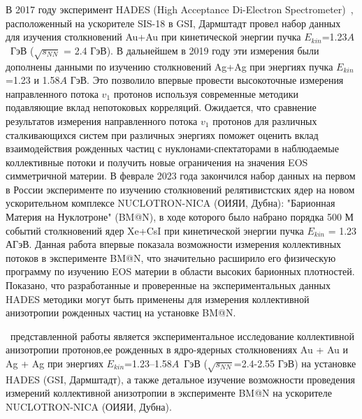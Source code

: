 В 2017 году эксперимент HADES (High Acceptance Di-Electron Spectrometer)~\cite{HADES:2009aat}, расположенный на ускорителе SIS-18 в GSI, Дармштадт провел набор данных для изучения  столкновений Au+Au  при кинетической энергии пучка $E_{kin}$=1.23$A$~ГэВ ($\sqrt{s_{NN}}$ = 2.4 ГэВ).
В дальнейшем в 2019 году эти измерения были дополнены данными по изучению столкновений Ag+Ag при энергиях пучка $E_{kin}$=1.23 и 1.58$A$ ГэВ.
Это позволило впервые провести высокоточные измерения направленного потока $v_1$ протонов используя современные методики подавляющие вклад непотоковых корреляций.  
Ожидается, что сравнение результатов измерения направленного потока $v_1$ протонов для различных сталкивающихся систем при различных энергиях поможет  оценить вклад взаимодействия рожденных частиц с нуклонами-спектаторами в наблюдаемые коллективные  потоки и получить новые ограничения на значения EOS симметричной материи.
В феврале 2023 года закончился набор данных на первом в России эксперименте по изучению столкновений релятивистских ядер на новом ускорительном комплексе NUCLOTRON-NICA (ОИЯИ, Дубна): "Барионная Материя на Нуклотроне" (BM@N), в ходе которого было набрано порядка 500 М событий столкновений ядер Xe+CsI при кинетической энергии пучка  $E_{kin}$ = 1.23 АГэВ. Данная работа впервые показала возможности измерения коллективных потоков
в эксперименте BM@N,  что значительно расширило его физическую программу по изучению EOS материи  в области высоких барионных плотностей.
Показано, что разработанные и проверенные на экспериментальных данных HADES методики могут быть применены для измерения коллективной анизотропии
рожденных частиц на установке BM@N.

\aim\ представленной работы является экспериментальное исследование коллективной анизотропии протонов,ее рожденных в ядро-ядерных столкновениях  Au + Au и Ag + Ag при энергиях $E_{kin}$=1.23--1.58$A$~ГэВ ($\sqrt{s_{NN}}$=2.4-2.55 ГэВ) на установке HADES (GSI, Дармштадт), а также детальное изучение возможности проведения измерений коллективной анизотропии в эксперименте BM@N на ускорителе NUCLOTRON-NICA (ОИЯИ, Дубна).

